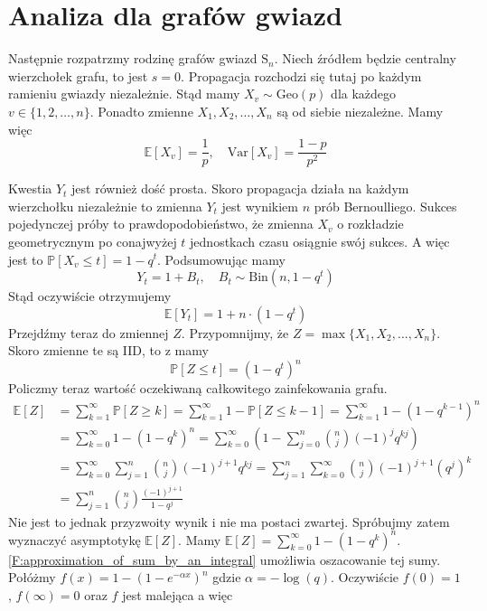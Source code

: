 \section{Analiza dla grafów gwiazd}

Następnie rozpatrzmy rodzinę grafów gwiazd $\mathrm{S}_n$. Niech źródłem będzie centralny wierzchołek grafu, to jest $s=0$. Propagacja rozchodzi się tutaj po każdym ramieniu gwiazdy niezależnie. Stąd mamy $X_v \sim \mathrm{Geo}(p)$ dla każdego $v\in\{1,2,\dots,n\}$. Ponadto zmienne $X_1,X_2,\dots,X_n$ są od siebie niezależne. Mamy więc
\[
    \mathbb{E}[X_v]=\frac{1}{p}, \quad \mathrm{Var}[X_v]=\frac{1-p}{p^2}
\]

Kwestia $Y_t$ jest również dość prosta. Skoro propagacja działa na każdym wierzchołku niezależnie to zmienna $Y_t$ jest wynikiem $n$ prób Bernoulliego. Sukces pojedynczej próby to prawdopodobieństwo, że zmienna $X_v$ o rozkładzie geometrycznym po conajwyżej $t$ jednostkach czasu osiągnie swój sukces. A więc jest to $\mathbb{P}[X_v\le t]=1-q^t$. Podsumowując mamy
\[
    Y_t = 1 + B_t, \quad B_t \sim \mathrm{Bin}(n, 1-q^t)
\]
Stąd oczywiście otrzymujemy 
\[
    \mathbb{E}[Y_t] = 1 + n\cdot (1-q^t)
\]
Przejdźmy teraz do zmiennej $Z$. Przypomnijmy, że $Z=\max\{X_1,X_2,\dots,X_n\}$. Skoro zmienne te są IID, to z  mamy 
\[
    \mathbb{P}[Z\le t] = (1-q^t)^n
\]
Policzmy teraz wartość oczekiwaną całkowitego zainfekowania grafu. 
\begin{equation*}
\begin{aligned}
\mathbb{E}[Z] 
&= \sum_{k=1}^{\infty} \mathbb{P}[Z\ge k] 
 = \sum_{k=1}^{\infty} 1 - \mathbb{P}[Z\le k-1]
 = \sum_{k=1}^{\infty}  1 - (1-q^{k-1})^n  \\
&= \sum_{k=0}^{\infty}  1 - (1-q^k)^n 
 = \sum_{k=0}^{\infty} \left( 1 - \sum_{j=0}^{n} \binom{n}{j} (-1)^j q^{kj} \right) \\
&= \sum_{k=0}^{\infty} \sum_{j=1}^{n} \binom{n}{j} (-1)^{j+1} q^{kj} = \sum_{j=1}^{n} \sum_{k=0}^{\infty} \binom{n}{j} (-1)^{j+1} (q^j)^k \\
&= \sum_{j=1}^{n} \binom{n}{j} \frac{(-1)^{j+1}}{1-q^j}
\end{aligned}
\end{equation*}
Nie jest to jednak przyzwoity wynik i nie ma postaci zwartej. Spróbujmy zatem wyznaczyć asymptotykę $\mathbb{E}[Z]$. Mamy $\mathbb{E}[Z] = \sum_{k=0}^{\infty}  1 - (1-q^k)^n$. \cref{F:approximation_of_sum_by_an_integral} umożliwia oszacowanie tej sumy. Połóżmy $f(x) = 1 - (1 - e^{-\alpha x})^n$ gdzie $\alpha = -\log(q)$. Oczywiście $f(0)=1$ , $f(\infty)=0$ oraz $f$ jest malejąca a więc
